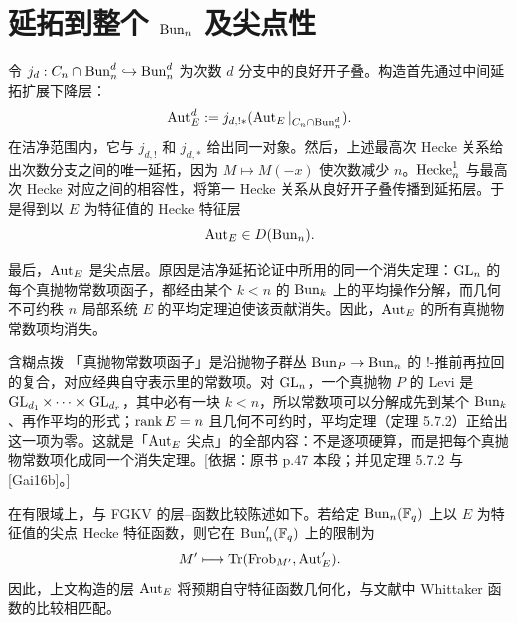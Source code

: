 \section{延拓到整个 \texorpdfstring{$\operatorname{Bun}_n$}{Bunₙ} 及尖点性}\label{sec:8.6}
令 $j_d:C_n\cap\operatorname{Bun}_n^d\hookrightarrow\operatorname{Bun}_n^d$ 为次数 $d$ 分支中的良好开子叠。构造首先通过中间延拓扩展下降层：
\[\operatorname{Aut}_E^d:=j_{d,!*}(\operatorname{Aut}_E|_{C_n\cap\operatorname{Bun}_n^d}).\]
在洁净范围内，它与 $j_{d,!}$ 和 $j_{d,*}$ 给出同一对象。然后，上述最高次 Hecke 关系给出次数分支之间的唯一延拓，因为 $M\mapsto M(-x)$ 使次数减少 $n$。$\operatorname{Hecke}_n^1$ 与最高次 Hecke 对应之间的相容性，将第一 Hecke 关系从良好开子叠传播到延拓层。于是得到以 $E$ 为特征值的 Hecke 特征层
\[\operatorname{Aut}_E\in D(\operatorname{Bun}_n).\]

最后，$\operatorname{Aut}_E$ 是尖点层。原因是洁净延拓论证中所用的同一个消失定理：$\operatorname{GL}_n$ 的每个真抛物常数项函子，都经由某个 $k<n$ 的 $\operatorname{Bun}_k$ 上的平均操作分解，而几何不可约秩 $n$ 局部系统 $E$ 的平均定理迫使该贡献消失。因此，$\operatorname{Aut}_E$ 的所有真抛物常数项均消失。
\begin{transnote}{含糊点拨}
「真抛物常数项函子」是沿抛物子群丛 $\operatorname{Bun}_P\to\operatorname{Bun}_n$ 的 $!$-推前再拉回的复合，对应经典自守表示里的常数项。对 $\operatorname{GL}_n$，一个真抛物 $P$ 的 Levi 是 $\operatorname{GL}_{d_1}\times\cdots\times\operatorname{GL}_{d_r}$，其中必有一块 $k<n$，所以常数项可以分解成先到某个 $\operatorname{Bun}_k$、再作平均的形式；$\operatorname{rank} E=n$ 且几何不可约时，平均定理（定理 5.7.2）正给出这一项为零。这就是「$\operatorname{Aut}_E$ 尖点」的全部内容：不是逐项硬算，而是把每个真抛物常数项化成同一个消失定理。[依据：原书 p.47 本段；并见定理 5.7.2 与 [Gai16b]。]
\end{transnote}

在有限域上，与 FGKV 的层–函数比较陈述如下。若给定 $\operatorname{Bun}_n(\mathbb F_q)$ 上以 $E$ 为特征值的尖点 Hecke 特征函数，则它在 $\operatorname{Bun}'_n(\mathbb F_q)$ 上的限制为
\[M'\longmapsto\operatorname{Tr}(\operatorname{Frob}_{M'},\operatorname{Aut}'_E).\]
因此，上文构造的层 $\operatorname{Aut}_E$ 将预期自守特征函数几何化，与文献\cite{FGKV98}中 Whittaker 函数的比较相匹配。
